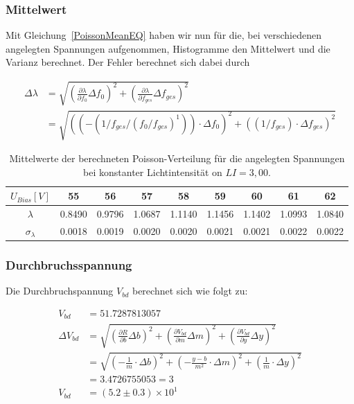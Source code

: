 \documentclass[12pt]{article}
\begin{document}
\subsubsection{Mittelwert}

Mit Gleichung~\ref{PoissonMeanEQ} haben wir nun für die, bei verschiedenen angelegten Spannungen aufgenommen, Histogramme den Mittelwert und die Varianz berechnet.
Der Fehler berechnet sich dabei durch

\begin{equation}
\begin{aligned}
\Delta \lambda &= \sqrt{\left( \frac{\partial \lambda}{\partial f_0} \Delta f_0 \right)^2 + \left( \frac{\partial \lambda}{\partial f_{ges}} \Delta f_{ges} \right)^2} \\ &= \sqrt{\left( \left( -(1 / f_{ges} / (f_0 / f_{ges}) ^ 1) \right) \cdot \Delta f_0 \right)^2 + \left( \left( 1 / f_{ges} \right) \cdot \Delta f_{ges} \right)^2}
\end{aligned}
\end{equation}


\begin{table}[h!]
  \begin{center}
    \begin{tabular}{|c|cccccccc|}
      \hline
      $U_{Bias} [V]$ & 55 & 56 & 57 & 58 & 59 & 60 & 61 & 62 \\
      \hline
      $\lambda$& 0.8490 & 0.9796 & 1.0687 & 1.1140 & 1.1456 & 1.1402 & 1.0993 & 1.0840\\
      \hline
      $\sigma_{\lambda}$& 0.0018 & 0.0019 & 0.0020 & 0.0020 & 0.0021 & 0.0021 & 0.0022 & 0.0022\\
      \hline
      
    \end{tabular}
    \caption{Mittelwerte der berechneten Poisson-Verteilung für die angelegten Spannungen bei konstanter Lichtintensität on $LI=3,00$.}
    \label{PoissonMean}
  \end{center}
\end{table}



\subsubsection{Durchbruchsspannung}
Die Durchbruchspannung $V_{bd}$ berechnet sich wie folgt zu:

\begin{align}
V_{bd} &= 51.7287813057 \\
\Delta V_{bd} &= \sqrt{\left( \frac{\partial R}{\partial b} \Delta b \right)^2 + \left( \frac{\partial V_{bd}}{\partial m} \Delta m \right)^2 + \left( \frac{\partial V_{bd}}{\partial y} \Delta y \right)^2} \\
&= \sqrt{\left(-\frac{1}{m}  \cdot \Delta b \right)^2 + \left( -\frac{y - b} { m ^ 2}  \cdot \Delta m \right)^2 + \left( \frac{1}{m} \cdot \Delta y \right)^2} \\&= 3.4726755053  = 3\\
V_{bd} &= \left( 5.2 \pm 0.3 \right) \times 10^{1}
\end{align}
\end{document}
